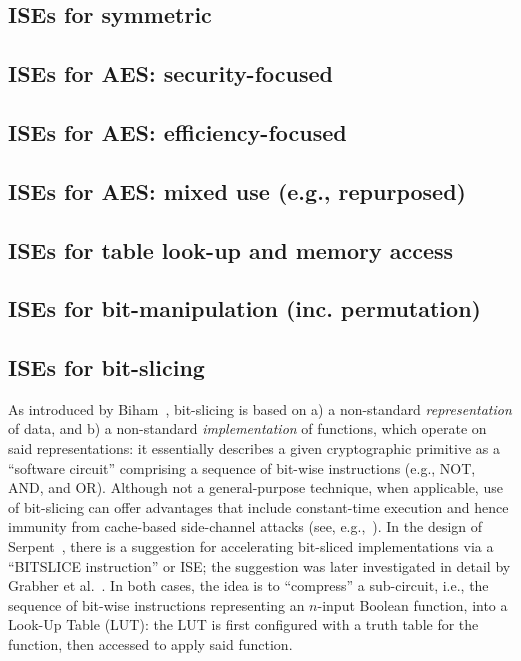 \subsection*{ISEs for symmetric}
\cite{SCARV:BurMcDAus:00,SCARV:MelElb:08,SCARV:MelElb:10}

\subsection*{ISEs for AES: security-focused}
\cite{SCARV:TilGro:07:a}
\subsection*{ISEs for AES: efficiency-focused}
\cite{SCARV:TilGroSze:05,SCARV:TilGro:06,SCARV:APRJ:11}
\subsection*{ISEs for AES: mixed use (e.g., repurposed)}
\cite{SCARV:TilGro:05,SCARV:TilGro:07:b,SCARV:BBGR:09,SCARV:BosOzeSta:11}

\subsection*{ISEs for table look-up and memory access}
\cite{SCARV:FisLee:01,SCARV:FisLee:05:a,SCARV:FisLee:05:b,SCARV:HilYinLee:08}
\subsection*{ISEs for bit-manipulation (inc. permutation)}
\cite{SCARV:ShiLee:00,SCARV:YanLee:00,SCARV:McGLee:01,SCARV:LeeShiYan:01,SCARV:ShiLee:02,SCARV:ShiYanLee:03,SCARV:LSYRR:04,SCARV:Shi:04,MASCAB:LeeYanShi:05,SCARV:HilYinLee:08,SCARV:HilLee:08,SCARV:ShiYanLee:08,SCARV:Hilewitz:08}
\subsection*{ISEs for bit-slicing}
As introduced by Biham~\cite{SCARV:Biham:97}, bit-slicing is based on
a) a non-standard {\em representation} of data,
   and
b) a non-standard {\em implementation} of functions, which operate on
   said representations:
it essentially describes a given cryptographic primitive as a  ``software 
circuit'' comprising a sequence of bit-wise instructions (e.g., NOT, AND, 
and OR).  Although not a general-purpose technique, when applicable, use
of bit-slicing can offer advantages that include constant-time execution 
and hence immunity from cache-based side-channel attacks
(see, e.g.,~\cite{SCARV:KasSch:09}).
In the design of Serpent~\cite[Page 232]{SCARV:BihAndKnu:98}, there is a
suggestion for accelerating bit-sliced implementations via a ``BITSLICE 
instruction'' or ISE; the suggestion was later investigated in detail by 
Grabher et al.~\cite{SCARV:GraGroPag:08}.  In both cases, the idea is to 
``compress'' a sub-circuit, i.e., the sequence of bit-wise instructions 
representing an $n$-input Boolean function, into a Look-Up Table (LUT): 
the LUT is first configured with a truth table for the function, then 
accessed to apply said function.  

